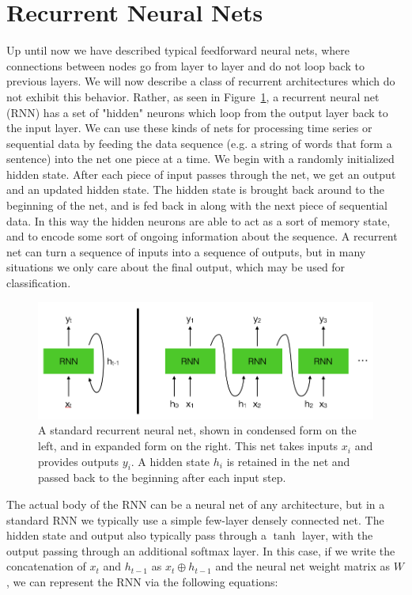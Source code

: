 \section{Recurrent Neural Nets}

Up until now we have described typical feedforward neural nets, where connections between nodes go from layer to layer and do not loop back to previous layers. We will now describe a class of recurrent architectures which do not exhibit this behavior. Rather, as seen in Figure~\ref{fig:RNN}, a recurrent neural net (RNN) has a set of "hidden" neurons which loop from the output layer back to the input layer. We can use these kinds of nets for processing time series or sequential data by feeding the data sequence (e.g. a string of words that form a sentence) into the net one piece at a time. We begin with a randomly initialized hidden state. After each piece of input passes through the net, we get an output and an updated hidden state. The hidden state is brought back around to the beginning of the net, and is fed back in along with the next piece of sequential data. In this way the hidden neurons are able to act as a sort of memory state, and to encode some sort of ongoing information about the sequence. A recurrent net can turn a sequence of inputs into a sequence of outputs, but in many situations we only care about the final output, which may be used for classification.

\begin{figure}[htbp]
    \centering
    \includegraphics[width=\linewidth]{Images/ML/RNN.png}
    \caption{A standard recurrent neural net, shown in condensed form on the left, and in expanded form on the right. This net takes inputs $x_i$ and provides outputs $y_i$. A hidden state $h_i$ is retained in the net and passed back to the beginning after each input step.}
    \label{fig:RNN}
\end{figure}

The actual body of the RNN can be a neural net of any architecture, but in a standard RNN we typically use a simple few-layer densely connected net. The hidden state and output also typically pass through a $\tanh$ layer, with the output passing through an additional softmax layer. In this case, if we write the concatenation of $x_t$ and $h_{t-1}$ as $x_t \oplus h_{t-1}$ and the neural net weight matrix as $W$, we can represent the RNN via the following equations:

